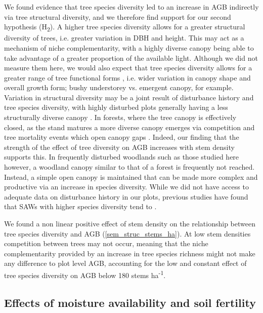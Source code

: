 \documentclass[11pt,a4paper]{article}
\newcommand{\textapprox}{\raisebox{0.5ex}{\texttildelow}}  %
\begin{document}
We found evidence that tree species diversity led to an increase in AGB indirectly via tree structural diversity, and we therefore find support for our second hypothesis (H\textsubscript{2}). A higher tree species diversity allows for a greater structural diversity of trees, i.e. greater variation in DBH and height. This may act as a mechanism of niche complementarity, with a highly diverse canopy being able to take advantage of a greater proportion of the available light. Although we did not measure them here, we would also expect that tree species diversity allows for a greater range of tree functional forms \citep{}, i.e. wider variation in canopy shape and overall growth form; bushy understorey vs. emergent canopy, for example. Variation in structural diversity may be a joint result of disturbance history and tree species diversity, with highly disturbed plots generally having a less structurally diverse canopy \citep{LaRue2019}. In forests, where the tree canopy is effectively closed, as the stand matures a more diverse canopy emerges via competition and tree mortality events which open canopy gaps \citep{Muscolo2014}. Indeed, our finding that the strength of the effect of tree diversity on AGB increases with stem density supports this. In frequently disturbed woodlands such as those studied here however, a woodland canopy similar to that of a forest is frequently not reached. Instead, a simple open canopy is maintained that can be made more complex and productive via an increase in species diversity. While we did not have access to adequate data on disturbance history in our plots, previous studies have found that SAWs with higher species diversity tend to  \citep{Chidumayo2013, Mutowo2012}.

We found a non linear positive effect of stem density on the relationship between tree species diversity and AGB (\autoref{sem_struc_stems_ha}). At low stem densities competition between trees may not occur, meaning that the niche complementarity provided by an increase in tree species richness might not make any difference to plot level AGB, accounting for the low and constant effect of tree species diversity on AGB below \textapprox{}180 stems ha\textsuperscript{-1}.

\subsection{Effects of moisture availability and soil fertility}
\end{document}

